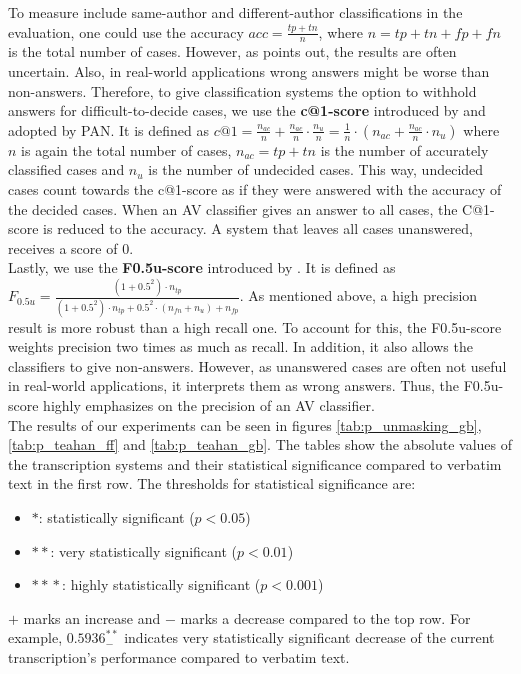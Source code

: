 To measure include same-author and different-author classifications in the evaluation, one could use the accuracy $acc = \frac{tp+tn}{n}$, where $n = tp+tn+fp+fn$ is the total number of cases.
However, as \cite{bevendorff2019unmaskingShortTexts} points out, the results are often uncertain.
Also, in real-world applications wrong answers might be worse than non-answers.
Therefore, to give classification systems the option to withhold answers for difficult-to-decide cases, we use the \textbf{c@1-score} introduced by \cite{penas2011c_at_1} and adopted by PAN.
It is defined as $c@1 = \frac{n_{ac}}{n}+\frac{n_{ac}}{n}\cdot{}\frac{n_u}{n} = \frac{1}{n}\cdot{}\left(n_{ac}+\frac{n_{ac}}{n}\cdot{}n_u\right)$ where $n$ is again the total number of cases, $n_{ac} = tp+tn$ is the number of accurately classified cases and $n_u$ is the number of undecided cases.
This way, undecided cases count towards the c@1-score as if they were answered with the accuracy of the decided cases.
When an AV classifier gives an answer to all cases, the C@1-score is reduced to the accuracy.
A system that leaves all cases unanswered, receives a score of 0.\\
Lastly, we use the \textbf{F0.5u-score} introduced by \cite{bevendorff2019unmaskingShortTexts}.
It is defined as $F_{0.5u} = \frac{(1+0.5^2)\cdot{}n_{tp}}{(1+0.5^2)\cdot{}n_{tp}+0.5^2\cdot{}(n_{fn}+n_u)+n_{fp}}$.
As mentioned above, a high precision result is more robust than a high recall one.
To account for this, the F0.5u-score weights precision two times as much as recall.
In addition, it also allows the classifiers to give non-answers.
However, as unanswered cases are often not useful in real-world applications, it interprets them as wrong answers.
Thus, the F0.5u-score highly emphasizes on the precision of an AV classifier.\\



The results of our experiments can be seen in figures \ref{tab:p_unmasking_gb}, \ref{tab:p_teahan_ff} and \ref{tab:p_teahan_gb}.
The tables show the absolute values of the transcription systems and their statistical significance compared to verbatim text in the first row.
The thresholds for statistical significance are:
\begin{itemize}
    \item $*$: statistically significant ($p < 0.05$)
    \item $*\! *$: very statistically significant ($p < 0.01$)
    \item $*\! *\! *$: highly statistically significant ($p < 0.001$)
\end{itemize}
$+$ marks an increase and $-$ marks a decrease compared to the top row.
For example, $0.5936^{*\! *}_{-}$ indicates very statistically significant decrease of the current transcription's performance compared to verbatim text.


